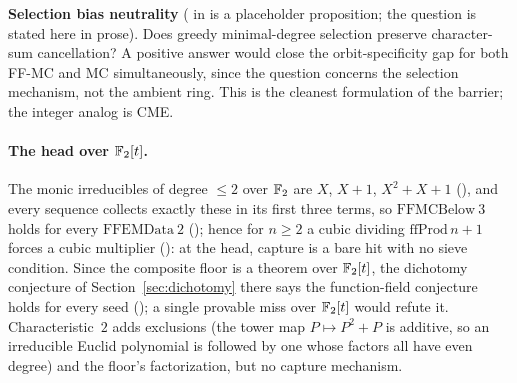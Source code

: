 \begin{frontierbox}
\textbf{Selection bias neutrality}
( in 
is a placeholder proposition; the question is stated here in prose).
Does greedy minimal-degree selection preserve character-sum cancellation?
A positive answer would close the orbit-specificity gap for both FF-MC
and MC simultaneously, since the question concerns the selection
mechanism, not the ambient ring.  This is the cleanest formulation of
the barrier; the integer analog is CME.
\end{frontierbox}

\paragraph{The head over $\mathbb{F}_2[t]$.}
The monic irreducibles of degree $\leq 2$ over $\mathbb{F}_2$ are $X$, $X{+}1$,
$X^2{+}X{+}1$
(),
and every sequence collects exactly these in its first three terms, so
$\mathrm{FFMCBelow}\ 3$ holds for every $\mathrm{FFEMData}\ 2$
(); hence for
$n \geq 2$ a cubic dividing $\mathrm{ffProd}\,n + 1$ forces a cubic
multiplier ():
at the head, capture is a bare hit with no sieve condition.  Since the
composite floor is a theorem over $\mathbb{F}_2[t]$, the dichotomy conjecture of
Section~\ref{sec:dichotomy} there says the function-field conjecture holds
for every seed
(); a
single provable miss over $\mathbb{F}_2[t]$ would refute it.  Characteristic~$2$
adds exclusions (the tower map $P \mapsto P^2+P$ is additive, so an
irreducible Euclid polynomial is followed by one whose factors all have
even degree) and the floor's factorization, but no capture mechanism.

